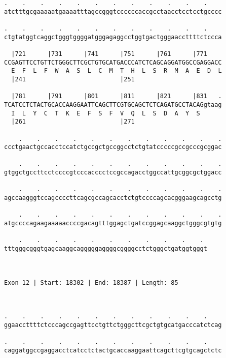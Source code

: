 \documentclass{article}
\begin{document}
\begin{Verbatim}
.    .    .    .    .    .    .    .    .    .    .    .    
atctttgcgaaaaatgaaaatttagccgggtccccccaccgcctaacctcctcctgcccc
                                                            
.    .    .    .    .    .    .    .    .    .    .    .    
ctgtatggtcaggctgggtggggatgggagaggcctggtgactgggaaccttttctccca
                                                            
  |721      |731      |741      |751      |761      |771    
CCGAGTTCCTGTTCTGGGCTTCGCTGTGCATGACCCATCTCAGCAGGATGGCCGAGGACC
  E  F  L  F  W  A  S  L  C  M  T  H  L  S  R  M  A  E  D  L
  |241                          |251                        
  
  |781      |791      |801      |811      |821      |831   .
TCATCCTCTACTGCACCAAGGAATTCAGCTTCGTGCAGCTCTCAGATGCCTACAGgtaag
  I  L  Y  C  T  K  E  F  S  F  V  Q  L  S  D  A  Y  S      
  |261                          |271                        
  
    .    .    .    .    .    .    .    .    .    .    .    .
ccctgaactgccacctccatctgccgctgccggcctctgtatcccccgccgcccgcggac
                                                            
    .    .    .    .    .    .    .    .    .    .    .    .
gtggctgccttcctccccgtcccacccctccgccagacctggccattgcggcgctggacc
                                                            
    .    .    .    .    .    .    .    .    .    .    .    .
agccaagggtccagccccttcagcgccagcacctctgtccccagcacgggaagcagcctg
                                                            
    .    .    .    .    .    .    .    .    .    .    .    .
atgccccagaagaaaaaccccgacagtttggagctgatccggagcaaggctgggcgtgtg
                                                            
    .    .    .    .    .    .    .    .    .    .    . 
tttgggcgggtgagcaaggcagggggaggggcggggcctctgggctgatggtgggt
                                                        
                                                        
 
Exon 12 | Start: 18302 | End: 18387 | Length: 85



.    .    .    .    .    .    .    .    .    .    .    .    
ggaaccttttctcccagccgagttcctgttctgggcttcgctgtgcatgacccatctcag
                                                            
.    .    .    .    .    .    .    .    .    .    .    .    
caggatggccgaggacctcatcctctactgcaccaaggaattcagcttcgtgcagctctc
                                                            

\end{Verbatim}
\end{document}
